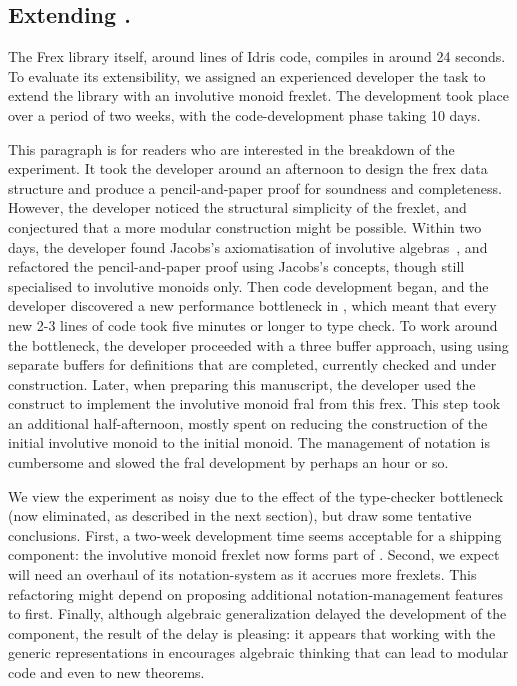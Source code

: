 \subsection{Extending \Frexlib{}.}
The Frex library itself, around \FrexlibLoC{} lines of Idris code,
compiles in around 24 seconds. To evaluate its extensibility, we
assigned an experienced \Frexlib{} developer the task to extend the
library with an involutive monoid frexlet. The development took place
over a period of two weeks, with the code-development phase taking 10
days.

This paragraph is for readers who are interested in the breakdown of
the experiment.  It took the developer around an afternoon to design
the frex data structure and produce a pencil-and-paper proof for
soundness and completeness. However, the developer noticed the
structural simplicity of the frexlet, and conjectured that a more modular
construction might be possible. Within two days, the developer found Jacobs's
axiomatisation of involutive algebras~\cite{jacobs:involution}, and
refactored the pencil-and-paper proof using Jacobs's concepts, though
still specialised to involutive monoids only. Then code development
began, and the developer discovered a new performance bottleneck in
\idris{}, which meant that every new 2-3 lines of \idris{} code took five
minutes or longer to type check. To work around the bottleneck, the
developer proceeded with a three buffer approach, using using separate
buffers for definitions that are completed, currently checked and under construction.
Later, when preparing this manuscript, the developer used
the \ByFrex{} construct to implement the involutive monoid fral from
this frex. This step took an additional half-afternoon, mostly spent on
reducing the construction of the initial involutive
monoid to the initial monoid. The management of notation is cumbersome
and slowed the fral development by perhaps an hour or so.

We view the experiment as noisy due to the effect of the type-checker
bottleneck (now eliminated, as described in the next section), but
draw some tentative conclusions.
%
First, a two-week development time seems acceptable for a shipping
component: the involutive monoid frexlet now forms part of \Frexlib{}.
%
Second, we expect \Frexlib{} will need an overhaul of its
notation-system as it accrues more frexlets. This refactoring might
depend on proposing additional notation-management features to
\idris{} first.
%
Finally, although algebraic generalization delayed the development of
the component, the result of the delay is pleasing: it appears that working
with the generic representations in \Frexlib{} encourages algebraic
thinking that can lead to modular code and even to new theorems.
